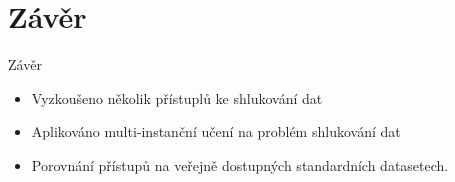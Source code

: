 \documentclass[10pt]{beamer}
\begin{document}
\section{Závěr}

\begin{frame}{Závěr}
	\begin{itemize}
		\item Vyzkoušeno několik přístuplů ke shlukování dat
		\item Aplikováno multi-instanční učení na problém shlukování dat
		\item Porovnání přístupů na veřejně dostupných standardních datasetech.
	\end{itemize}
\end{frame}
\end{document}
